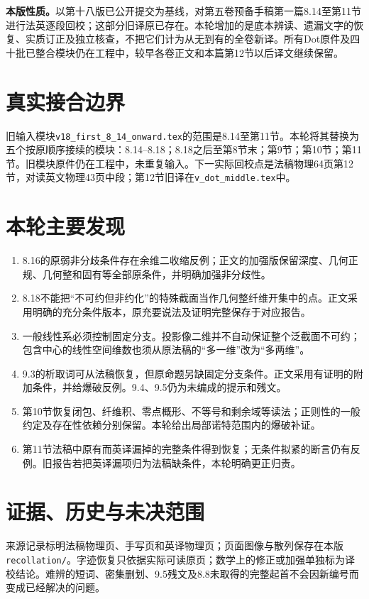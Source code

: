 \noindent\textbf{本版性质。}以第十八版已公开提交为基线，对第五卷预备手稿第一篇8.14至第11节进行法英逐段回校；这部分旧译原已存在。本轮增加的是底本辨读、遗漏文字的恢复、实质订正及独立核查，不把它们计为从无到有的全卷新译。所有Dot原件及四十批已整合模块仍在工程中，较早各卷正文和本篇第12节以后译文继续保留。

\section*{真实接合边界}
旧输入模块\texttt{v18\_first\_8\_14\_onward.tex}的范围是8.14至第11节。本轮将其替换为五个按原顺序接续的模块：8.14--8.18；8.18之后至第8节末；第9节；第10节；第11节。旧模块原件仍在工程中，未重复输入。下一实际回校点是法稿物理64页第12节，对读英文物理43页中段；第12节旧译在\texttt{v\_dot\_middle.tex}中。

\section*{本轮主要发现}
\begin{enumerate}
\item 8.16的原弱非分歧条件存在余维二收缩反例；正文的加强版保留深度、几何正规、几何整和固有等全部原条件，并明确加强非分歧性。
\item 8.18不能把“不可约但非约化”的特殊截面当作几何整纤维开集中的点。正文采用明确的充分条件版本，原充要说法及证明完整保存于对应报告。
\item 一般线性系必须控制固定分支。投影像二维并不自动保证整个泛截面不可约；包含中心的线性空间维数也须从原法稿的“多一维”改为“多两维”。
\item 9.3的析取词可从法稿恢复，但原命题另缺固定分支条件。正文采用有证明的附加条件，并给爆破反例。9.4、9.5仍为未编成的提示和残文。
\item 第10节恢复闭包、纤维积、零点概形、不等号和剩余域等读法；正则性的一般约定及存在性依赖分别保留。本轮给出局部诺特范围内的爆破补证。
\item 第11节法稿中原有而英译漏掉的完整条件得到恢复；无条件拟紧的断言仍有反例。旧报告若把英译漏项归为法稿缺条件，本轮明确更正归责。
\end{enumerate}

\section*{证据、历史与未决范围}
来源记录标明法稿物理页、手写页和英译物理页；页面图像与散列保存在本版\texttt{recollation/}。字迹恢复只依据实际可读原页；数学上的修正或加强单独标为译校结论。难辨的短词、密集删划、9.5残文及8.8未取得的完整起首不会因新编号而变成已经解决的问题。

